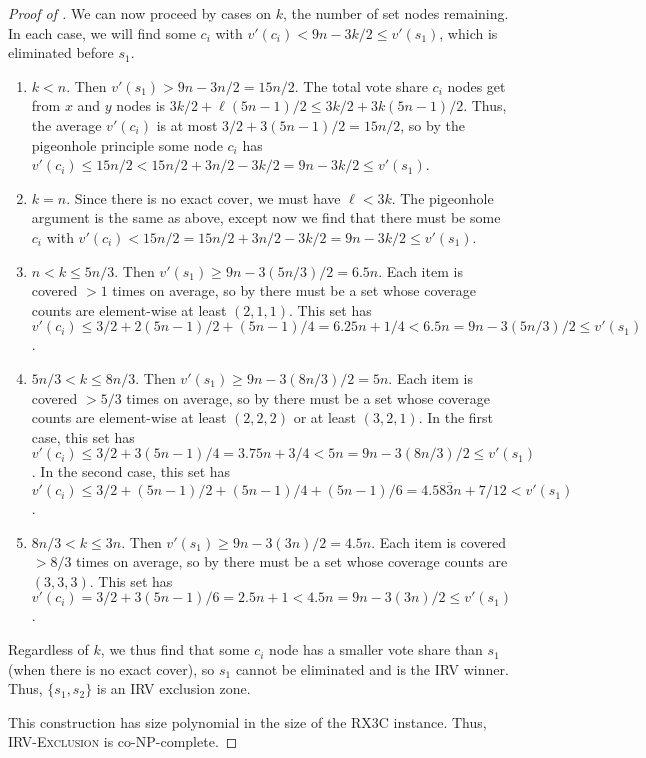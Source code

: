 \documentclass{article}
\theoremstyle{theorem}
\theoremstyle{definition}
\begin{document}
\begin{proof}[Proof of ]
 We can now proceed by cases on $k$, the number of set nodes remaining. In each case, we will find some $c_i$ with $v'(c_i) < 9n-3k/2 \le v'(s_1)$, which is eliminated before $s_1$.
 \begin{enumerate}
  \item $k < n$. Then $v'(s_1) > 9n - 3n/2 = 15n/2$. The total vote share $c_i$ nodes get from $x$ and $y$ nodes is $3k/2 + \ell (5n-1)/2 \le 3k/2 + 3k(5n-1)/2$. Thus, the average $v'(c_i)$ is at most $3/2 + 3(5n-1)/2 = 15n/2$, so by the pigeonhole principle some node $c_i$ has $v'(c_i) \le 15n/2 < 15n/2 + 3n/2 - 3k/2 = 9n-3k/2 \le v'(s_1)$.
  \item $k = n$. Since there is no exact cover, we must have $\ell < 3k$. The pigeonhole argument is the same as above, except now we find that there must be some $c_i$ with $v'(c_i) < 15n/2 = 15n/2 + 3n/2 - 3k/2 = 9n - 3k/2 \le v'(s_1)$. 
  \item $n < k \le 5n/3$. Then $v'(s_1) \ge 9n - 3(5n/3)/2 = 6.5n$. Each item is covered $> 1$ times on average, so by  there must be a set whose coverage counts are element-wise at least $(2, 1, 1)$. This set has $v'(c_i) \le 3/2 + 2(5n-1)/2 + (5n-1)/4 = 6.25n + 1/4 <  6.5n = 9n - 3(5n/3)/2 \le v'(s_1)$.
  \item $5n/3 < k \le 8n/3$. Then $v'(s_1) \ge 9n - 3(8n/3)/2 = 5n$. Each item is covered $> 5/3$ times on average, so by  there must be a set whose coverage counts are element-wise at least $(2, 2, 2)$ or at least $(3, 2, 1)$. In the first case, this set has $v'(c_i) \le 3/2 + 3(5n-1)/4 = 3.75n + 3/4 < 5n =  9n - 3(8n/3)/2 \le  v'(s_1)$. In the second case, this set has $v'(c_i) \le 3/2 + (5n-1)/2 + (5n-1)/4 + (5n-1)/6 = 4.58\overline{3}n + 7/12  <  v'(s_1)$.
  \item $8n/3 < k \le 3n$. Then $v'(s_1) \ge 9n - 3(3n)/2 = 4.5n$. Each item is covered $> 8/3$ times on average, so  by  there must be a set whose coverage counts are $(3, 3, 3)$. This set has $v'(c_i) = 3/2 + 3(5n-1)/6 = 2.5n + 1 < 4.5n = 9n - 3(3n)/2 \le v'(s_1)$. 
\end{enumerate}
Regardless of $k$, we thus find that some $c_i$ node has a smaller vote share than $s_1$ (when there is no exact cover), so $s_1$ cannot be eliminated and is the IRV winner. Thus, $\{s_1, s_2\}$ is an IRV exclusion zone.

This construction has size polynomial in the size of the RX3C instance. Thus, \textsc{IRV-Exclusion} is co-NP-complete. 
\end{proof}
\end{document}
